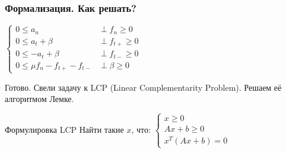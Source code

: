 \documentclass{beamer}
\begin{document}
\begin{frame}[t]
\frametitle{Формализация. Как решать?}
    \small \bigskip \bigskip \medskip
    $
    \begin{cases}
        0 \le a_n                       &\perp f_n    \ge 0 \\
        0 \le a_t + \beta               &\perp f_{t+} \ge 0 \\
        0 \le -a_t + \beta              &\perp f_{t-} \ge 0 \\
        0 \le \mu f_n - f_{t+} - f_{t-} &\perp \beta  \ge 0
    \end{cases}
    $

    \bigskip
    Готово. Свели задачу к LCP (Linear Complementarity Problem).
    Решаем её алгоритмом Лемке.
    
    \begin{block}{Формулировка LCP}
    Найти такие $x$, что:
    $
    \begin{cases}
        x \ge 0 \\
        Ax + b \ge 0 \\
        x^T(Ax+b) = 0
    \end{cases}
    $
    \end{block}
\end{frame}
\end{document}
